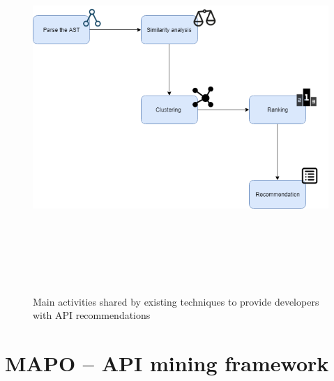 \begin{figure}[!h]
	\includegraphics[width=12cm,height=14cm,keepaspectratio]{images/approach.png}
	\centering
	\caption{Main activities shared by 
	existing techniques to provide 
	developers with API recommendations}
	\label{fig:apiRecommendationExistingApproaches}
\end{figure}










\section{MAPO -- API mining framework}

